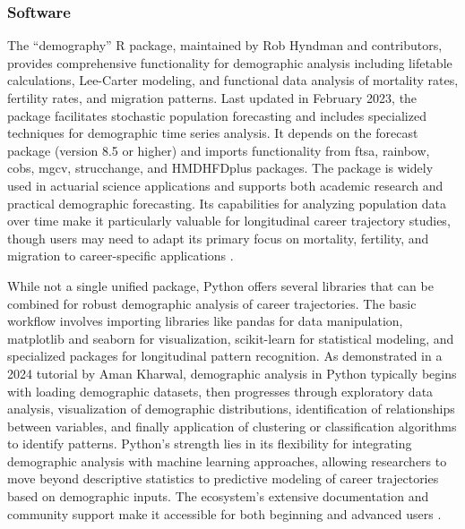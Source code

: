 \documentclass[../main.tex]{subfiles}
\begin{document}
\subsubsection{Software}

 The ``demography'' R package, maintained by Rob Hyndman and contributors, provides comprehensive functionality for demographic analysis including lifetable calculations, Lee-Carter modeling, and functional data analysis of mortality rates, fertility rates, and migration patterns. Last updated in February 2023, the package facilitates stochastic population forecasting and includes specialized techniques for demographic time series analysis. It depends on the forecast package (version 8.5 or higher) and imports functionality from ftsa, rainbow, cobs, mgcv, strucchange, and HMDHFDplus packages. The package is widely used in actuarial science applications and supports both academic research and practical demographic forecasting. Its capabilities for analyzing population data over time make it particularly valuable for longitudinal career trajectory studies, though users may need to adapt its primary focus on mortality, fertility, and migration to career-specific applications \citep{hyndman2023demography}.

 While not a single unified package, Python offers several libraries that can be combined for robust demographic analysis of career trajectories. The basic workflow involves importing libraries like pandas for data manipulation, matplotlib and seaborn for visualization, scikit-learn for statistical modeling, and specialized packages for longitudinal pattern recognition. As demonstrated in a 2024 tutorial by Aman Kharwal, demographic analysis in Python typically begins with loading demographic datasets, then progresses through exploratory data analysis, visualization of demographic distributions, identification of relationships between variables, and finally application of clustering or classification algorithms to identify patterns. Python's strength lies in its flexibility for integrating demographic analysis with machine learning approaches, allowing researchers to move beyond descriptive statistics to predictive modeling of career trajectories based on demographic inputs. The ecosystem's extensive documentation and community support make it accessible for both beginning and advanced users \citep{kharwal2024demographics}.
\end{document}
